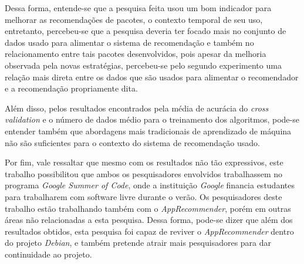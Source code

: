 Dessa forma, entende-se que a pesquisa feita usou um bom indicador para melhorar as
recomendações de pacotes, o contexto temporal de seu uso, entretanto,
percebeu-se que a pesquisa deveria ter focado mais no conjunto de dados usado
para alimentar o sistema de recomendação e também no relacionamento entre tais
pacotes desenvolvidos, pois apesar da melhoria observada pela novas estratégias,
percebeu-se pelo segundo experimento uma relação mais direta entre os dados que
são usados para alimentar o recomendador e a recomendação propriamente dita.

Além disso, pelos resultados encontrados pela média de acurácia do \textit{cross
validation} e o número de dados médio para o treinamento dos algoritmos, pode-se
entender também que abordagens mais tradicionais de aprendizado de máquina não
são suficientes para o contexto do sistema de recomendação usado.

Por fim, vale ressaltar que mesmo com os resultados não tão expressivos, este
trabalho possibilitou que ambos os pesquisadores envolvidos trabalhassem no
programa \textit{Google Summer of Code}, onde a instituição \textit{Google}
financia estudantes para trabalharem com software livre durante o verão. Os
pesquisadores deste trabalho estão trabalhando também com o
\textit{AppRecommender}, porém em outras áreas não relacionadas a esta pesquisa.
Dessa forma, pode-se dizer que além dos resultados obtidos, esta pesquisa foi
capaz de reviver o \textit{AppRecommender} dentro do projeto \textit{Debian},
e também pretende atrair mais pesquisadores para dar continuidade ao projeto.
